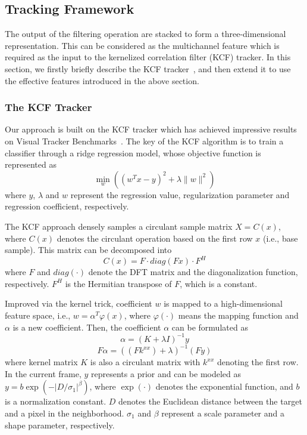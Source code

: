 \documentclass[runningheads,a4paper]{llncs}
\begin{document}
\subsection{Tracking Framework}

The output of the filtering operation are stacked to form a three-dimensional representation. This can be considered as the multichannel feature which is required as the input to the kernelized correlation filter (KCF) tracker. In this section, we firstly briefly describe the KCF tracker~\cite{KCF}, and then extend it to use the effective features introduced in the above section.

\subsubsection{The KCF Tracker}

Our approach is built on the KCF tracker which has achieved impressive results on Visual Tracker Benchmarks~\cite{VOT}. The key of the KCF algorithm is to train a classifier through a ridge regression model, whose objective function is represented as
\begin{equation}\label{2}
\min_{w} ( (w^Tx-y)^2 +\lambda \| w \|^2)
\end{equation}
where  $y$, $\lambda$ and $w$ represent the regression value, regularization parameter and regression coefficient, respectively.

The KCF approach densely samples a circulant sample matrix $X=C(x)$, where $C(x)$ denotes the circulant operation based on the first row $x$ (i.e., base sample). This matrix can be decomposed into
\begin{equation}\label{3}
C(x)=F \cdot diag (Fx) \cdot F^H
\end{equation}
where $F$ and $diag(\cdot)$ denote the DFT matrix and the diagonalization function, respectively. $F^H$ is the Hermitian transpose of $F$, which is a constant.

Improved via the kernel trick, coefficient $w$ is mapped to a high-dimensional feature space, i.e., $w=\alpha^T \varphi (x)$, where $\varphi(\cdot)$ means the mapping function and $\alpha$ is a new coefficient. Then, the coefficient $\alpha$ can be formulated as
\begin{equation}\label{4}
\alpha =(K+\lambda I)^{-1}y
\end{equation}
\begin{equation}\label{5}
F\alpha =((Fk^{xx})+\lambda)^{-1}(Fy)
\end{equation}
where kernel matrix $K$ is also a circulant matrix with $k^{xx}$ denoting the first row. In the current frame, $y$ represents a prior and can be modeled as $y=b\exp(-|D/\sigma_1|^{\beta})$, where $\exp(\cdot)$ denotes the exponential function, and $b$ is a normalization constant. $D$ denotes the Euclidean distance between the target and a pixel in the neighborhood. $\sigma_1$ and $\beta$ represent a scale parameter and a shape parameter, respectively.
\end{document}
